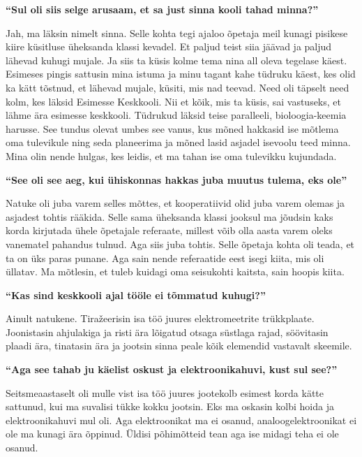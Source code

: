 \textbf{\enquote{Sul oli siis selge arusaam, et sa just sinna kooli tahad
minna?}}

Jah, ma läksin nimelt sinna. Selle kohta tegi ajaloo õpetaja meil kunagi
pisikese kiire küsitluse üheksanda klassi kevadel. Et paljud teist siia jäävad
ja paljud lähevad kuhugi mujale. Ja siis ta küsis kolme tema nina all oleva
tegelase käest. Esimeses pingis sattusin mina istuma ja minu tagant kahe
tüdruku käest, kes olid ka kätt tõstnud, et lähevad mujale, küsiti, mis nad
teevad. Need oli täpselt need kolm, kes läksid Esimesse Keskkooli. Nii et kõik,
mis ta küsis, sai vastuseks, et lähme ära esimesse keskkooli. Tüdrukud läksid
teise paralleeli, bioloogia-keemia harusse. See tundus olevat umbes see vanus,
kus mõned hakkasid ise mõtlema oma tulevikule ning seda planeerima ja mõned
lasid asjadel isevoolu teed minna. Mina olin nende hulgas, kes leidis, et ma
tahan ise oma tulevikku kujundada.

\textbf{\enquote{See oli see aeg, kui ühiskonnas hakkas juba muutus tulema, eks
ole}}

Natuke oli juba varem selles mõttes, et kooperatiivid olid juba varem olemas
ja asjadest tohtis rääkida. Selle sama üheksanda klassi jooksul ma jõudsin kaks
korda kirjutada ühele õpetajale referaate, millest võib olla aasta varem oleks
vanematel pahandus tulnud. Aga siis juba tohtis. Selle õpetaja kohta oli teada,
et ta on üks paras punane. Aga sain nende referaatide eest isegi kiita, mis oli
üllatav. Ma mõtlesin, et tuleb kuidagi oma seisukohti kaitsta, sain hoopis
kiita.

\textbf{\enquote{Kas sind keskkooli ajal tööle ei tõmmatud kuhugi?}}

Ainult natukene. Tiražeerisin isa töö juures elektromeetrite trükkplaate.
Joonistasin ahjulakiga ja risti ära lõigatud otsaga süstlaga rajad, söövitasin
plaadi ära, tinatasin ära ja jootsin sinna peale kõik elemendid vastavalt
skeemile.

\textbf{\enquote{Aga see tahab ju käelist oskust ja elektroonikahuvi, kust sul
see?}}

Seitsmeaastaselt oli mulle vist isa töö juures jootekolb esimest korda kätte
sattunud, kui ma suvalisi tükke kokku jootsin. Eks ma oskasin kolbi hoida ja
elektroonikahuvi mul oli. Aga elektroonikat ma ei osanud, analoogelektroonikat
ei ole ma kunagi ära õppinud. Üldisi põhimõtteid tean aga ise midagi teha ei
ole osanud.

